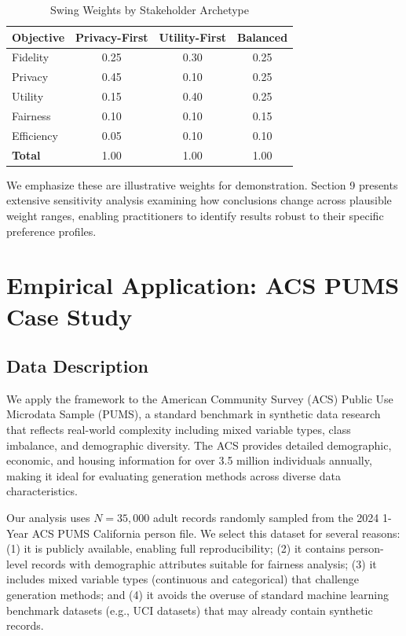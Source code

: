 \documentclass[12pt,a4paper]{article}
\begin{document}
\begin{table}[htbp]
\centering
\caption{Swing Weights by Stakeholder Archetype}
\label{tab:weights}
\begin{tabular}{@{}lccc@{}}
\toprule
\textbf{Objective} & \textbf{Privacy-First} & \textbf{Utility-First} & \textbf{Balanced} \\
\midrule
Fidelity & 0.25 & 0.30 & 0.25 \\
Privacy & 0.45 & 0.10 & 0.25 \\
Utility & 0.15 & 0.40 & 0.25 \\
Fairness & 0.10 & 0.10 & 0.15 \\
Efficiency & 0.05 & 0.10 & 0.10 \\
\midrule
\textbf{Total} & 1.00 & 1.00 & 1.00 \\
\bottomrule
\end{tabular}
\end{table}

We emphasize these are illustrative weights for demonstration. Section 9 presents extensive sensitivity analysis examining how conclusions change across plausible weight ranges, enabling practitioners to identify results robust to their specific preference profiles.

\section{Empirical Application: ACS PUMS Case Study}

\subsection{Data Description}

We apply the framework to the American Community Survey (ACS) Public Use Microdata Sample (PUMS), a standard benchmark in synthetic data research that reflects real-world complexity including mixed variable types, class imbalance, and demographic diversity. The ACS provides detailed demographic, economic, and housing information for over 3.5 million individuals annually, making it ideal for evaluating generation methods across diverse data characteristics.

Our analysis uses $N = 35{,}000$ adult records randomly sampled from the 2024 1-Year ACS PUMS California person file. We select this dataset for several reasons: (1) it is publicly available, enabling full reproducibility; (2) it contains person-level records with demographic attributes suitable for fairness analysis; (3) it includes mixed variable types (continuous and categorical) that challenge generation methods; and (4) it avoids the overuse of standard machine learning benchmark datasets (e.g., UCI datasets) that may already contain synthetic records.
\end{document}
